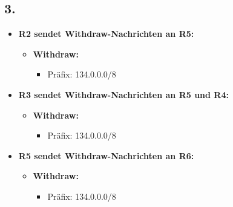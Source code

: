 \documentclass[a4paper]{scrartcl}
\begin{document}
\subsection*{3.}
\begin{itemize}
  \item \textbf{R2 sendet Withdraw-Nachrichten an R5:}
  \begin{itemize}
      \item \textbf{Withdraw:}
      \begin{itemize}
          \item Präfix: 134.0.0.0/8
      \end{itemize}
  \end{itemize}
  \item \textbf{R3 sendet Withdraw-Nachrichten an R5 und R4:}
  \begin{itemize}
      \item \textbf{Withdraw:}
      \begin{itemize}
          \item Präfix: 134.0.0.0/8
      \end{itemize}
  \end{itemize}
  \item \textbf{R5 sendet Withdraw-Nachrichten an R6:}
  \begin{itemize}
      \item \textbf{Withdraw:}
      \begin{itemize}
          \item Präfix: 134.0.0.0/8
      \end{itemize}
  \end{itemize}
\end{itemize}
\end{document}
